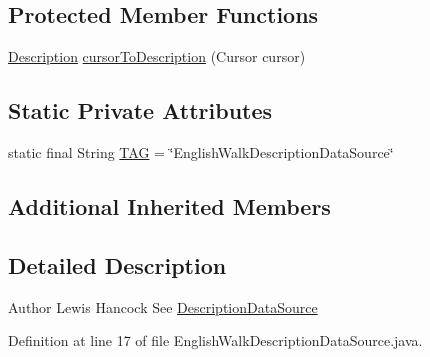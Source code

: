 \subsection*{Protected Member Functions}
\begin{DoxyCompactItemize}
\item 
\hyperlink{classuk_1_1ac_1_1swan_1_1digitaltrails_1_1components_1_1_description}{Description} \hyperlink{classuk_1_1ac_1_1swan_1_1digitaltrails_1_1database_1_1_english_walk_description_data_source_abc08ebd7f8918195c924ecddc70a53cb}{cursor\+To\+Description} (Cursor cursor)
\end{DoxyCompactItemize}
\subsection*{Static Private Attributes}
\begin{DoxyCompactItemize}
\item 
static final String \hyperlink{classuk_1_1ac_1_1swan_1_1digitaltrails_1_1database_1_1_english_walk_description_data_source_a710b541c97a7aa4696ea4a8fc4055c3a}{T\+A\+G} = \char`\"{}English\+Walk\+Description\+Data\+Source\char`\"{}
\end{DoxyCompactItemize}
\subsection*{Additional Inherited Members}


\subsection{Detailed Description}
\begin{DoxyAuthor}{Author}
Lewis Hancock See \hyperlink{classuk_1_1ac_1_1swan_1_1digitaltrails_1_1database_1_1_description_data_source}{Description\+Data\+Source} 
\end{DoxyAuthor}


Definition at line 17 of file English\+Walk\+Description\+Data\+Source.\+java.



